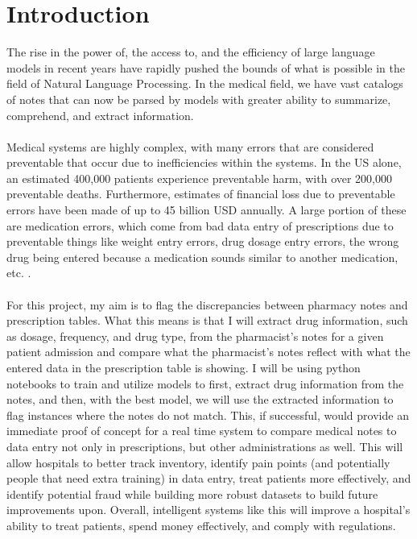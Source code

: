 \documentclass[sigconf,nonacm]{acmart} %
\begin{document}
\section{Introduction}
The rise in the power of, the access to, and the efficiency of large language models in recent years have rapidly pushed the bounds of what is possible in the field of Natural Language Processing. In the medical field, we have vast catalogs of notes that can now be parsed by models with greater ability to summarize, comprehend, and extract information.
\\\\Medical systems are highly complex, with many errors that are considered preventable that occur due to inefficiencies within the systems. In the US alone, an estimated 400,000 patients experience preventable harm, with over 200,000 preventable deaths. Furthermore, estimates of financial loss due to preventable errors have been made of up to 45 billion USD annually. A large portion of these are medication errors, which come from bad data entry of prescriptions due to preventable things like weight entry errors, drug dosage entry errors, the wrong drug being entered because a medication sounds similar to another medication, etc. \cite{NIH}.
\\\\For this project, my aim is to flag the discrepancies between pharmacy notes and prescription tables. What this means is that I will extract drug information, such as dosage, frequency, and drug type, from the pharmacist's notes for a given patient admission and compare what the pharmacist's notes reflect with what the entered data in the prescription table is showing. I will be using python notebooks to train and utilize models to first, extract drug information from the notes, and then, with the best model, we will use the extracted information to flag instances where the notes do not match. This, if successful, would provide an immediate proof of concept for a real time system to compare medical notes to data entry not only in prescriptions, but other administrations as well. This will allow hospitals to better track inventory, identify pain points (and potentially people that need extra training) in data entry, treat patients more effectively, and identify potential fraud while building more robust datasets to build future improvements upon. Overall, intelligent systems like this will improve a hospital's ability to treat patients, spend money effectively, and comply with regulations.  
\end{document}
